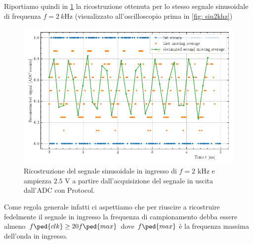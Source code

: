 \documentclass[10pt, a4paper, italian]{article}
\begin{document}
Riportiamo quindi in \cref{fig: sin2khzpy} la ricostruzione ottenuta per lo
stesso segnale sinusoidale di frequenza $f = \SI{2}{k\Hz}$ (visualizzato
all'oscilloscopio prima in \cref{fig: sin2khz}) 
\begin{figure}[htbp]
    \centering
	\includegraphics[width=\textwidth]{sin2khzpy}
    \caption{Ricostruzione del segnale sinusoidale in ingresso di $f = 2$
    kHz e ampiezza $2.5$ V a partire dall'acquisizione del segnale in uscita
    dall'ADC con Protocol.
    \label{fig: sin2khzpy}}
\end{figure}
Come regola generale infatti ci aspettiamo che per riuscire a ricostruire
fedelmente il segnale in ingresso la frequenza di campionamento debba essere
almeno $f\ped{clk} \geq 20 f\ped{max}$ dove $f\ped{max}$ è la frequenza
massima dell'onda in ingresso.
\end{document}
